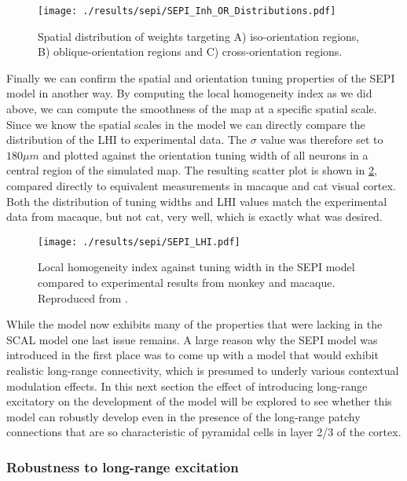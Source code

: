 \begin{figure}
	\centering
        \texttt{[image: ./results/sepi/SEPI\_Inh\_OR\_Distributions.pdf]}
	\caption{Spatial distribution of weights targeting A)
      iso-orientation regions, B) oblique-orientation regions and C)
      cross-orientation regions.}
	\label{SEPI_OR_Distributions}
\end{figure}

Finally we can confirm the spatial and orientation tuning properties
of the SEPI model in another way. By computing the local homogeneity
index as we did above, we can compute the smoothness of the map at a
specific spatial scale. Since we know the spatial scales in the model
we can directly compare the distribution of the LHI to experimental
data. The $\sigma$ value was therefore set to $180 \mu m$ and plotted
against the orientation tuning width of all neurons in a central
region of the simulated map. The resulting scatter plot is shown in
\ref{SEPILHI}, compared directly to equivalent measurements in macaque
and cat visual cortex. Both the distribution of tuning widths and LHI
values match the experimental data from macaque, but not cat, very
well, which is exactly what was desired.

\begin{figure}
	\centering
        \texttt{[image: ./results/sepi/SEPI\_LHI.pdf]}
	\caption{Local homogeneity index against tuning width in the SEPI
      model compared to experimental results from monkey and
      macaque. Reproduced from \cite{Nauhaus2008}.}
	\label{SEPILHI}
\end{figure}

While the model now exhibits many of the properties that were lacking
in the SCAL model one last issue remains. A large reason why the SEPI
model was introduced in the first place was to come up with a model
that would exhibit realistic long-range connectivity, which is
presumed to underly various contextual modulation effects. In this
next section the effect of introducing long-range excitatory on the
development of the model will be explored to see whether this model
can robustly develop even in the presence of the long-range patchy
connections that are so characteristic of pyramidal cells in layer 2/3
of the cortex.

\subsubsection{Robustness to long-range excitation}

